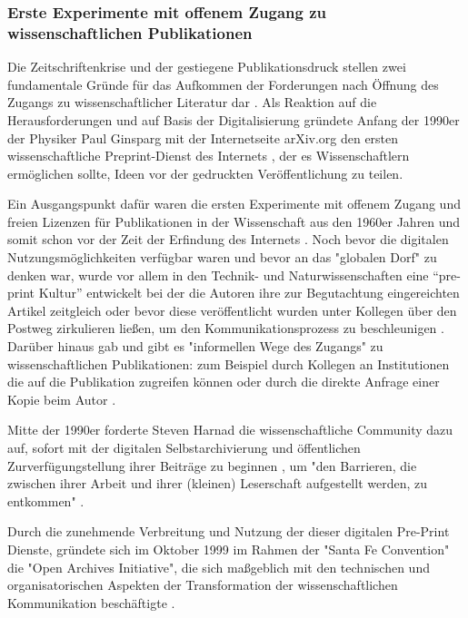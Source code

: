 \subsubsection{Erste Experimente mit offenem Zugang zu wissenschaftlichen Publikationen}

Die Zeitschriftenkrise und der gestiegene Publikationsdruck stellen zwei fundamentale Gründe für das Aufkommen der Forderungen nach Öffnung des Zugangs zu wissenschaftlicher Literatur dar \cite{Brintzinger_2010} \cite{wein_2010_erwerbung}. Als Reaktion auf die Herausforderungen und auf Basis der Digitalisierung gründete Anfang der 1990er der Physiker Paul Ginsparg mit der Internetseite arXiv.org den ersten wissenschaftliche Preprint-Dienst des Internets \cite{cite:5} \cite{bjork_2004_open}, der es Wissenschaftlern ermöglichen sollte, Ideen vor der gedruckten Veröffentlichung zu teilen.

Ein Ausgangspunkt dafür waren die ersten Experimente mit offenem Zugang und freien Lizenzen für Publikationen in der Wissenschaft aus den 1960er Jahren und somit schon vor der Zeit der Erfindung des Internets \cite{cite:18b}. Noch bevor die digitalen Nutzungsmöglichkeiten verfügbar waren und bevor an das "globalen Dorf" \cite{mcluhan_1962_gutenberg} zu denken war, wurde vor allem in den Technik- und Naturwissenschaften eine “pre-print Kultur” entwickelt bei der die Autoren ihre zur Begutachtung eingereichten Artikel zeitgleich oder bevor diese veröffentlicht wurden unter Kollegen über den Postweg zirkulieren ließen, um den Kommunikationsprozess zu beschleunigen \cite{suchen-Hoffmann-Zugang-undVerwertung-oeffentlicher-Informationen}. Darüber hinaus gab und gibt es "informellen Wege des Zugangs" zu wissenschaftlichen Publikationen: zum Beispiel durch Kollegen an Institutionen die auf die Publikation zugreifen können oder durch die direkte Anfrage einer Kopie beim Autor \cite{davis_2011_open}.

Mitte der 1990er forderte Steven Harnad die wissenschaftliche Community dazu auf, sofort mit der digitalen Selbstarchivierung und öffentlichen Zurverfügungstellung ihrer Beiträge zu beginnen \cite{albert_2006_open_implications}, um "den Barrieren, die zwischen ihrer Arbeit und ihrer (kleinen) Leserschaft aufgestellt werden, zu entkommen" \cite{harnad_1995_subversive_proposal}.

Durch die zunehmende Verbreitung und Nutzung der dieser digitalen Pre-Print Dienste, gründete sich im Oktober 1999 im Rahmen der "Santa Fe Convention" die "Open Archives Initiative", die sich maßgeblich mit den technischen und organisatorischen Aspekten der Transformation der wissenschaftlichen Kommunikation beschäftigte \cite{van_2000_santa_fe}.

